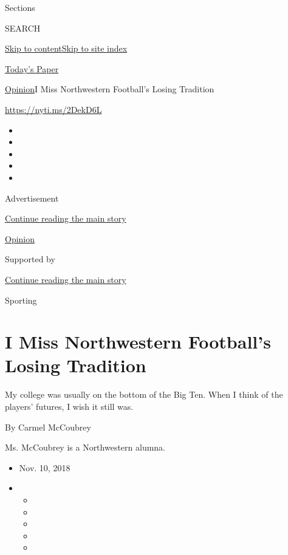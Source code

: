 Sections

SEARCH

\protect\hyperlink{site-content}{Skip to
content}\protect\hyperlink{site-index}{Skip to site index}

\href{https://myaccount.nytimes.com/auth/login?response_type=cookie\&client_id=vi}{}

\href{https://www.nytimes.com/section/todayspaper}{Today's Paper}

\href{/section/opinion}{Opinion}\textbar{}I Miss Northwestern Football's
Losing Tradition

\href{https://nyti.ms/2DekD6L}{https://nyti.ms/2DekD6L}

\begin{itemize}
\item
\item
\item
\item
\item
\end{itemize}

Advertisement

\protect\hyperlink{after-top}{Continue reading the main story}

\href{/section/opinion}{Opinion}

Supported by

\protect\hyperlink{after-sponsor}{Continue reading the main story}

Sporting

\hypertarget{i-miss-northwestern-footballs-losing-tradition}{%
\section{I Miss Northwestern Football's Losing
Tradition}\label{i-miss-northwestern-footballs-losing-tradition}}

My college was usually on the bottom of the Big Ten. When I think of the
players' futures, I wish it still was.

By Carmel McCoubrey

Ms. McCoubrey is a Northwestern alumna.

\begin{itemize}
\item
  Nov. 10, 2018
\item
  \begin{itemize}
  \item
  \item
  \item
  \item
  \item
  \end{itemize}
\end{itemize}

